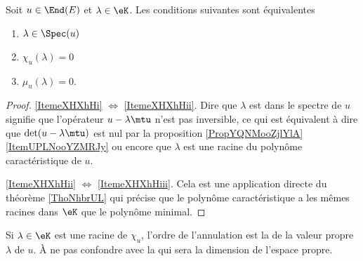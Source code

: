 \begin{theorem} \label{ThoWDGooQUGSTL}
    Soit \( u\in\End(E)\) et \( \lambda\in\eK\). Les conditions suivantes sont équivalentes
    \begin{enumerate}
        \item\label{ItemeXHXhHi}
            \( \lambda\in\Spec(u)\)
        \item\label{ItemeXHXhHii}
            \( \chi_u(\lambda)=0\)
        \item\label{ItemeXHXhHiii}
            \( \mu_u(\lambda)=0\).
    \end{enumerate}
\end{theorem}

\begin{proof}
    \ref{ItemeXHXhHi} \( \Leftrightarrow\) \ref{ItemeXHXhHii}. Dire que \( \lambda\) est dans le spectre de \( u\) signifie que l'opérateur \( u-\lambda\mtu\) n'est pas inversible, ce qui est équivalent à dire que \( \det(u-\lambda\mtu)\) est nul par la proposition \ref{PropYQNMooZjlYlA}\ref{ItemUPLNooYZMRJy} ou encore que \( \lambda\) est une racine du polynôme caractéristique de \( u\). 

    \ref{ItemeXHXhHii} \( \Leftrightarrow\) \ref{ItemeXHXhHiii}. Cela est une application directe du théorème \ref{ThoNhbrUL} qui précise que le polynôme caractéristique a les mêmes racines dans \(\eK\) que le polynôme minimal.
\end{proof}

\begin{definition}
    Si \( \lambda\in\eK\) est une racine de \( \chi_u\), l'ordre de l'annulation est la  de la valeur propre \( \lambda\) de \( u\). À ne pas confondre avec la  qui sera la dimension de l'espace propre.
\end{definition}


